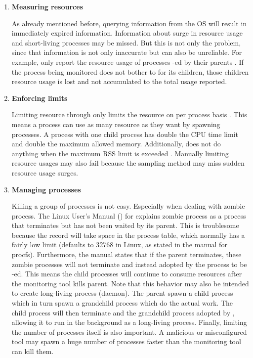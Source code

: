 \begin{enumerate}
    \item \textbf{Measuring resources}

    As already mentioned before, querying information from the OS will result in immediately expired information.
    Information about surge in resource usage and short-living processes may be missed.
    But this is not only the problem, since that information is not only inaccurate but can also be unreliable.
    For example,  only report the resource usage of processes -ed by their parents \citep{manpages}.
    If the process being monitored does not bother to  for its children, those children resource usage is lost and not accumulated to the total usage reported.

    \item \textbf{Enforcing limits}

    Limiting resource through  only limits the resource on per process basis \citep{manpages}.
    This means a process can use as many resource as they want by spawning processes.
    A process with one child process has double the CPU time limit and double the maximum allowed memory.
    Additionally,  does not do anything when the maximum RSS limit is exceeded \citep{manpages}.
    Manually limiting resource usages may also fail because the sampling method may miss sudden resource usage surges.

    \item \textbf{Managing processes}

    Killing a group of processes is not easy.
    Especially when dealing with zombie process.
    The Linux User's Manual (\citeyear{manpages}) for  explains zombie process as a process that terminates but has not been waited by its parent.
    This is troublesome because the record will take space in the process table, which normally has a fairly low limit (defaults to 32768 in Linux, as stated in the manual for procfs).
    Furthermore, the manual states that if the parent terminates, these zombie processes will not terminate and instead adopted by the  process to be -ed.
    This means the child processes will continue to consume resources after the monitoring tool kills parent.
    Note that this behavior may also be intended to create long-living process (daemon).
    The parent spawn a child process which in turn spawn a grandchild process which do the actual work.
    The child process will then terminate and the grandchild process adopted by , allowing it to run in the background as a long-living process.
    Finally, limiting the number of processes itself is also important.
    A malicious or misconfigured tool may spawn a huge number of processes faster than the monitoring tool can kill them.

\end{enumerate}



